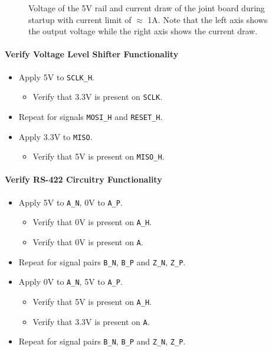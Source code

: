 \begin{figure}[h]
	\centering
	
	\caption[Voltages and current of 5V converter without current limit.]{Voltage of the 5V rail and current draw of the joint board during startup with current limit of $\approx$ 1A. Note that the left axis shows the output voltage while the right axis shows the current draw.}
	\label{fig:joint_no_curr_limit}
\end{figure}

\paragraph{Verify Voltage Level Shifter Functionality} %
\label{par:verify_voltage_level_shifter_functionality}
\begin{itemize}
	\item Apply 5V to \texttt{SCLK\_H}.
	\begin{itemize}
		\item[\cmark]  Verify that 3.3V is present on \texttt{SCLK}.
	\end{itemize}
	\item Repeat for signals \texttt{MOSI\_H} and \texttt{RESET\_H}.
	\item Apply 3.3V to \texttt{MISO}.
	\begin{itemize}
		\item[\cmark]  Verify that 5V is present on \texttt{MISO\_H}.
	\end{itemize}
\end{itemize}

\paragraph{Verify RS-422 Circuitry Functionality} %
\label{par:verify_rs_422_circuitry_functionality}
\begin{itemize}
	\item Apply 5V to \texttt{A\_N}, 0V to \texttt{A\_P}.
	\begin{itemize}
		\item[\cmark] Verify that 0V is present on \texttt{A\_H}.
		\item[\cmark] Verify that 0V is present on \texttt{A}.
	\end{itemize}
	\item Repeat for signal pairs \texttt{B\_N}, \texttt{B\_P} and \texttt{Z\_N}, \texttt{Z\_P}.
	\item Apply 0V to \texttt{A\_N}, 5V to \texttt{A\_P}.
	\begin{itemize}
		\item[\cmark] Verify that 5V is present on \texttt{A\_H}.
		\item[\cmark] Verify that 3.3V is present on \texttt{A}.
	\end{itemize}
	\item Repeat for signal pairs \texttt{B\_N}, \texttt{B\_P} and \texttt{Z\_N}, \texttt{Z\_P}.
\end{itemize}
